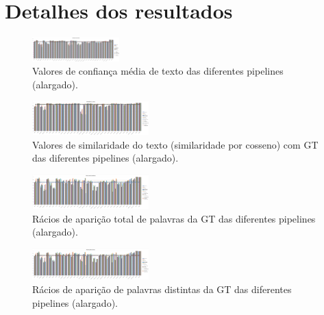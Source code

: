 \chapter{Detalhes dos resultados}


\begin{figure}[H]
	\centering
	\includegraphics[angle=90,width=0.3\textwidth]{images/resultados/graph_avg_text_conf.png}
	\caption{Valores de confiança média de texto das diferentes pipelines (alargado).}
	\label{fig:graph_avg_text_conf_large}
\end{figure}



\begin{figure}[H]
	\centering
	\includegraphics[angle=90,width=0.4\textwidth]{images/resultados/graph_gt_similiraty_cosine.png}
	\caption{Valores de similaridade do texto (similaridade por cosseno) com GT das diferentes pipelines (alargado).}
	\label{fig:graph_gt_similiraty_cosine_large}
\end{figure}


\begin{figure}[H]
	\centering
	\includegraphics[angle=90,width=0.4\textwidth]{images/resultados/graph_gt_word_hit_ratio.png}
	\caption{Rácios de aparição total de palavras da GT das diferentes pipelines (alargado).}
	\label{fig:graph_gt_word_hit_ratio_large}
\end{figure}


\begin{figure}[H]
	\centering
	\includegraphics[angle=90,width=0.4\textwidth]{images/resultados/graph_gt_unique_word_hit_ratio.png}
	\caption{Rácios de aparição de palavras distintas da GT das diferentes pipelines (alargado).}
	\label{fig:graph_gt_unique_word_hit_ratio_large}
\end{figure}


